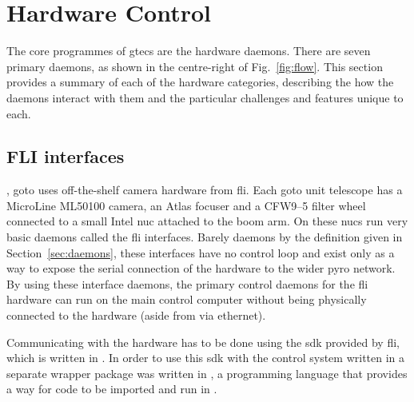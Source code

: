 \section{Hardware Control}
\label{sec:hardware_control}
\begin{colsection}


\begin{colsection}

The core programmes of \gls{gtecs} are the hardware daemons. There are seven primary daemons, as shown in the centre-right of Fig.~\ref{fig:flow}. This section provides a summary of each of the hardware categories, describing the how the daemons interact with them and the particular challenges and features unique to each.

\end{colsection}


\subsection{FLI interfaces}
\label{sec:fli}
\begin{colsection}

, \gls{goto} uses off-the-shelf camera hardware from \gls{fli}. Each \gls{goto} unit telescope has a MicroLine ML50100 camera, an Atlas focuser and a CFW9--5 filter wheel connected to a small Intel \gls{nuc} attached to the boom arm. On these \glspl{nuc} run very basic daemons called the \gls{fli} interfaces. Barely daemons by the definition given in Section~\ref{sec:daemons}, these interfaces have no control loop and exist only as a way to expose the serial connection of the hardware to the wider \gls{pyro} network. By using these interface daemons, the primary control daemons for the \gls{fli} hardware can run on the main control computer without being physically connected to the hardware (aside from via ethernet).

Communicating with the hardware has to be done using the \gls{sdk} provided by \gls{fli}, which is written in . In order to use this \gls{sdk} with the control system written in  a separate wrapper package  was written in , a programming language that provides a way for  code to be imported and run in .


\end{colsection}
\end{colsection}
